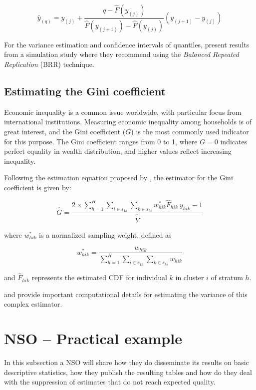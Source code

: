 \documentclass[
  12pt,
]{book}
\begin{document}
\[
\widehat{y}_{(q)} = y_{(j)} + \frac{q - \widehat{F}(y_{(j)})}{\widehat{F}(y_{(j+1)}) - \widehat{F}(y_{(j)})} (y_{(j+1)} - y_{(j)})
\]

For the variance estimation and confidence intervals of quantiles, \citet{kovar1988bootstrap} present results from a simulation study where they recommend using the \emph{Balanced Repeated Replication} (BRR) technique.

\hypertarget{estimating-the-gini-coefficient}{%
\subsection{Estimating the Gini coefficient}\label{estimating-the-gini-coefficient}}

Economic inequality is a common issue worldwide, with particular focus from international institutions. Measuring economic inequality among households is of great interest, and the Gini coefficient (\(G\)) is the most commonly used indicator for this purpose. The Gini coefficient ranges from 0 to 1, where \(G = 0\) indicates perfect equality in wealth distribution, and higher values reflect increasing inequality.

Following the estimation equation proposed by \citet{binder1995estimating}, the estimator for the Gini coefficient is given by:

\[
\widehat{G} = \frac {2 \times \sum_{h=1}^{H} \sum_{i \in s_{1h}} \sum_{k \in s_{hi}}  w_{hik}^{*} \widehat{F}_{hik} \ y_{hik} - 1} {\widehat{\overline{Y}}}
\]

where \(w_{hik}^{*}\) is a normalized sampling weight, defined as

\[
w_{hik}^{*} = \frac{w_{hik}} {\sum_{h=1}^{H} \sum_{i \in s_{1h}}  \sum_{k \in s_{hi}} w_{hik}}
\]

and \(\widehat{F}_{hik}\) represents the estimated CDF for individual \(k\) in cluster \(i\) of stratum \(h\).

\citet{osier2009variance} and \citet{Langel_Tille_2013} provide important computational details for estimating the variance of this complex estimator.

\hypertarget{nso-practical-example}{%
\section{NSO -- Practical example}\label{nso-practical-example}}

In this subsection a NSO will share how they do disseminate its results on basic descriptive statistics, how they publish the resulting tables and how do they deal with the suppression of estimates that do not reach expected quality.
\end{document}
